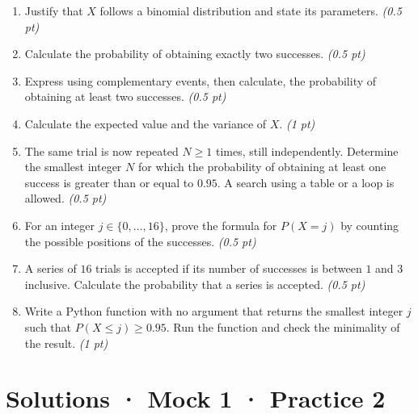 \begin{enumerate}

\item Justify that $X$ follows a binomial distribution and state its parameters. \hfill\textit{(0.5 pt)}

\item Calculate the probability of obtaining exactly two successes. \hfill\textit{(0.5 pt)}

\item Express using complementary events, then calculate, the probability of obtaining at least two successes. \hfill\textit{(0.5 pt)}

\item Calculate the expected value and the variance of $X$. \hfill\textit{(1 pt)}

\item The same trial is now repeated $N\ge1$ times, still independently. Determine the smallest integer $N$ for which the probability of obtaining at least one success is greater than or equal to $0.95$. A search using a table or a loop is allowed. \hfill\textit{(0.5 pt)}

\item For an integer $j\in\{0,\ldots,16\}$, prove the formula for $P(X=j)$ by counting the possible positions of the successes. \hfill\textit{(0.5 pt)}

\item A series of $16$ trials is accepted if its number of successes is between $1$ and $3$ inclusive. Calculate the probability that a series is accepted. \hfill\textit{(0.5 pt)}

\item Write a Python function with no argument that returns the smallest integer $j$ such that $P(X\le j)\ge0.95$. Run the function and check the minimality of the result. \hfill\textit{(1 pt)}

\end{enumerate}

\ifprof\clearpage

\section*{Solutions · Mock 1 · Practice 2}\label{cor:5-2}

